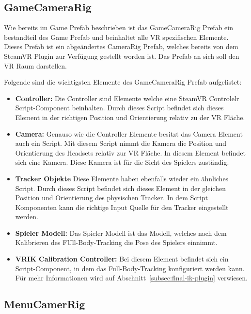 \subsection{GameCameraRig}\label{subsec:game-camera-rig}

Wie bereits im Game Prefab beschrieben ist das GameCameraRig Prefab ein bestandteil des Game Prefab und beinhaltet alle VR spezifischen Elemente.
Dieses Prefab ist ein abgeändertes CameraRig Prefab, welches bereits von dem SteamVR Plugin zur Verfügung gestellt worden ist.
Das Prefab an sich soll den VR Raum darstellen.

Folgende sind die wichtigsten Elemente des GameCameraRig Prefab aufgelistet:

\begin{itemize}
    \item \textbf{Controller:} Die Controller sind Elemente welche eine SteamVR Controlelr Script-Component beinhalten.
    Durch dieses Script befindet sich dieses Element in der richtigen Position und Orientierung relativ zu der VR Fläche.
    \item \textbf{Camera:} Genauso wie die Controller Elemente besitzt das Camera Element auch ein Script.
    Mit diesem Script nimmt die Kamera die Position und Orientierung des Headsets relativ zur VR Fläche.
    In diesem Element befindet sich eine Kamera.
    Diese Kamera ist für die Sicht des Spielers zuständig.
    \item \textbf{Tracker Objekte} Diese Elemente haben ebenfalls wieder ein ähnliches Script.
    Durch dieses Script befindet sich dieses Element in der gleichen Position und Orientierung des physischen Tracker.
    In dem Script Komponenten kann die richtige Input Quelle für den Tracker eingestellt werden.
    \item \textbf{Spieler Modell:} Das Spieler Modell ist das Modell, welches nach dem Kalibrieren des FUll-Body-Tracking die Pose des Spielers einnimmt.
    \item \textbf{VRIK Calibration Controller:} Bei diesem Element befindet sich ein Script-Component, in dem das Full-Body-Tracking konfiguriert werden kann.
    Für mehr Informationen wird auf Abschnitt~\ref{subsec:final-ik-plugin} verwiesen.
\end{itemize}

\subsection{MenuCamerRig}\label{subsec:menu-camera-rig}


